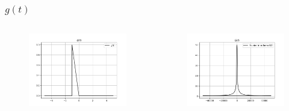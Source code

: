 \documentclass{beamer}
\begin{document}
\begin{frame}
  \frametitle{$g(t)$}
 \begin{columns}
\begin{column}{0.5\textwidth}
\begin{figure}
\begin{flushleft}
\includegraphics[width=\columnwidth]{graphs/g.png}

\end{flushleft}
\end{figure}
\end{column}
\begin{column}{0.5\textwidth}
\begin{figure}
\begin{flushleft}
\includegraphics[width=\columnwidth]{graphs/fourier_g.png}

\end{flushleft}
\end{figure}
\end{column}
\end{columns}
\end{frame}
\end{document}
